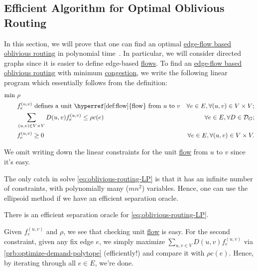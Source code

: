 \subsection{Efficient Algorithm for Optimal Oblivious Routing}
In this section, we will prove that one can find an optimal \hyperref[def:edge-based-oblivious-routing]{edge-flow based oblivious routing} in polynomial time~\cite{azar2003optimal}. In particular, we will consider directed graphs since it is easier to define edge-based \hyperref[def:flow]{flows}. To find an \hyperref[def:edge-based-oblivious-routing]{edge-flow based oblivious routing} with minimum \hyperref[def:congestion-of-oblivious-routing]{congestion}, we write the following linear program which essentially follows from the definition:
\begin{equation}\label{eq:oblivious-routing-LP}
	\begin{aligned}
		\min~ & \rho                                                                                                                                \\
		      & f_e^{(u, v)} \text{ defines a unit \hyperref[def:flow]{flow} from \(u\) to \(v\)} & \forall e \in E, \forall (u, v) \in V \times V; \\
		      & \sum_{(u, v) \in V \times V} D(u, v) f_e^{(u, v)}  \leq \rho c(e)                 & \forall e \in E, \forall D \in \mathcal{D} _G;  \\
		      & f_e^{(u, v)} \geq 0                                                               & \forall e \in E, \forall (u, v) \in V \times V.
	\end{aligned}
\end{equation}

\begin{note}
	We omit writing down the linear constraints for the unit \hyperref[def:flow]{flow} from \(u\) to \(v\) since it's easy.
\end{note}

The only catch in solve \autoref{eq:oblivious-routing-LP} is that it has an infinite number of constraints, with polynomially many (\(mn^2\)) variables. Hence, one can use the ellipsoid method if we have an efficient separation oracle.

\begin{claim}
	There is an efficient separation oracle for \autoref{eq:oblivious-routing-LP}.
\end{claim}
\begin{explanation}
	Given \(f_e^{(u, v)}\) and \(\rho \), we see that checking unit \hyperref[def:flow]{flow} is easy. For the second constraint, given any fix edge \(e\), we simply maximize \(\sum_{u, v \in V} D(u, v) f_e^{(u, v)}\) via \autoref{prb:optimize-demand-polytope} (efficiently!) and compare it with \(\rho c(e)\). Hence, by iterating through all \(e \in E\), we're done.
\end{explanation}


